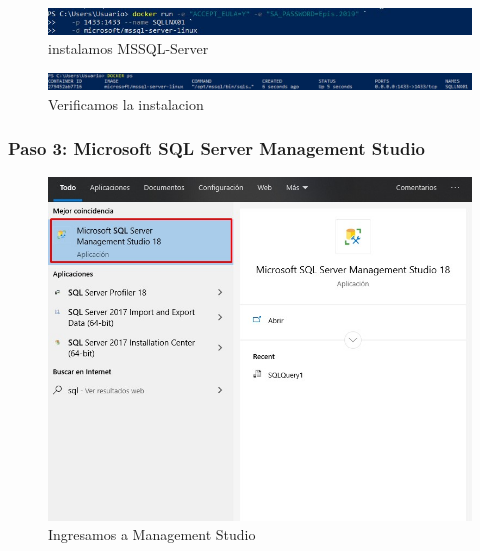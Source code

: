 \documentclass[preprint,12pt]{elsarticle}
\begin{document}
\begin{figure}[H]
	\begin{center}
		\includegraphics[width=12cm]{./IMAGENES/foto10} 
		\caption{instalamos MSSQL-Server}
	\end{center}
\end{figure}

\begin{figure}[H]
	\begin{center}
		\includegraphics[width=12cm]{./IMAGENES/foto11} 
		\caption{Verificamos la instalacion}
	\end{center}
\end{figure}

\subsubsection{\textbf{Paso 3: Microsoft SQL Server Management Studio}}
\begin{figure}[H]
	\begin{center}
		\includegraphics[width=12cm]{./IMAGENES/foto12} 
		\caption{Ingresamos a Management Studio}
	\end{center}
\end{figure}
\end{document}
